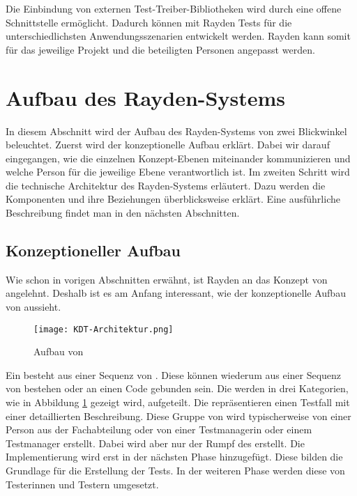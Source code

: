 \SuperPar
Die Einbindung von externen Test-Treiber-Bibliotheken wird durch eine offene Schnittstelle ermöglicht. Dadurch können mit Rayden Tests für die unterschiedlichsten Anwendungsszenarien entwickelt werden. Rayden kann somit für das jeweilige Projekt und die beteiligten Personen angepasst werden. 

\section{Aufbau des Rayden-Systems}

In diesem Abschnitt wird der Aufbau des Rayden-Systems von zwei Blickwinkel beleuchtet. Zuerst wird der konzeptionelle Aufbau erklärt. Dabei wir darauf eingegangen, wie die einzelnen Konzept-Ebenen miteinander kommunizieren und welche Person für die jeweilige Ebene verantwortlich ist. Im zweiten Schritt wird die technische Architektur des Rayden-Systems erläutert. Dazu werden die Komponenten und ihre Beziehungen überblicksweise erklärt. Eine ausführliche Beschreibung findet man in den nächsten Abschnitten.

\subsection{Konzeptioneller Aufbau}

Wie schon in vorigen Abschnitten erwähnt, ist Rayden an das Konzept von  angelehnt. Deshalb ist es am Anfang interessant, wie der konzeptionelle Aufbau von  aussieht. 

\begin{figure}[h]
\centering
\texttt{[image: KDT-Architektur.png]}
\caption{Aufbau von }
\label{fig:kdt-arch}
\end{figure}

\SuperPar
Ein  besteht aus einer Sequenz von . Diese  können wiederum aus einer Sequenz von  bestehen oder an einen Code gebunden sein. Die  werden in drei Kategorien, wie in Abbildung \ref{fig:kdt-arch} gezeigt wird, aufgeteilt. Die  repräsentieren einen Testfall mit einer detaillierten Beschreibung. Diese Gruppe von  wird typischerweise von einer Person aus der Fachabteilung oder von einer Testmanagerin oder einem Testmanager erstellt. Dabei wird aber nur der Rumpf des  erstellt. Die Implementierung wird erst in der nächsten Phase hinzugefügt. Diese  bilden die Grundlage für die Erstellung der Tests. In der weiteren Phase werden diese  von Testerinnen und Testern umgesetzt.

